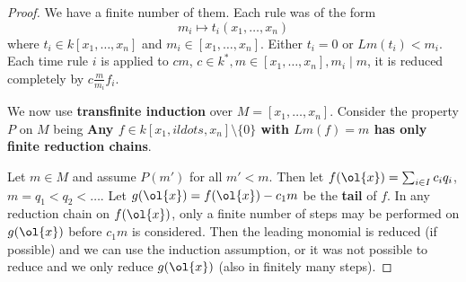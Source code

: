 \begin{proof}
We have a finite number of them. Each rule
was of the form
\[
    m_i \mapsto t_i(x_1, \ldots, x_n)
\]
where $t_i \in k[x_1, \ldots, x_n]$ and $m_i \in [x_1, \ldots, x_n]$.
Either $t_i = 0$ or $Lm(t_i) < m_i$. Each time rule $i$ is applied
to $cm$, $c \in k^*, m\in [x_1,\ldots, x_n], m_i \mid m$,
it is reduced completely by $c\frac{m}{m_i}f_i$.

We now use \textbf{transfinite induction} over $M = [x_1, \ldots, x_n]$.
Consider the property $P$ on $M$ being 
\textbf{Any $f\in k[x_1,ildots, x_n]\setminus \{0\}$ with 
$Lm(f) = m$ has only finite reduction chains}.

Let $m\in M$ and assume $P(m')$ for all $m' < m$.
Then let $f(\ol{x}) = \sum_{i\in I}c_i q_i$, $m = q_1 < q_2 < \ldots$.
Let $g(\ol{x}) = f(\ol{x}) - c_1m$ be the \textbf{tail} of $f$.
In any reduction chain on $f(\ol{x})$, only a finite number of steps 
may be performed on $g(\ol{x})$ before $c_1m$ is considered.
Then the leading monomial is reduced (if possible) and we can use the induction
assumption, or it was not possible to reduce and we only reduce $g(\ol{x})$
(also in finitely many steps).



\end{proof}